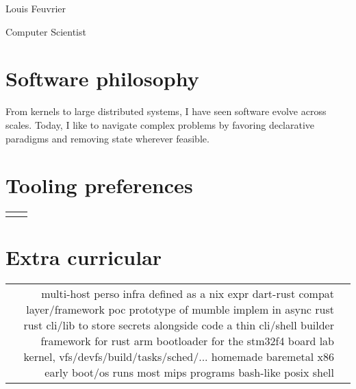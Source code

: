 \documentclass[
	10pt, %
]{freemancv}
\begin{document}
\begin{paracol}{2} %

\parbox[][0.11\textheight][c]{\linewidth}{ %
	\centering %

	{\sffamily\Huge Louis Feuvrier} %

	\medskip %

	{\textcolor{headings}{Computer Scientist}}

	\medskip %


	\vfill %
}

\section{Software philosophy}
From kernels to large distributed systems, I have seen software evolve across
scales. Today, I like to navigate complex problems by favoring declarative
paradigms and removing state wherever feasible.

\section{Tooling preferences}
\begin{supertabular}{r l} %
\end{supertabular}

\section{Extra curricular}
\begin{supertabular}{r l} %
		{multi-host perso infra defined as a nix expr}{}
		{dart-rust compat layer/framework poc}{}
		{prototype of mumble implem in async rust}{}
		{rust cli/lib to store secrets alongside code}{}
		{a thin cli/shell builder framework for rust}{}
		{arm bootloader for the stm32f4 board}{}
		{lab kernel, vfs/devfs/build/tasks/sched/...}{}
		{homemade baremetal x86 early boot/os}{}
		{runs most mips programs}{}
		{bash-like posix shell}{}
\end{supertabular}


\end{paracol}
\end{document}
